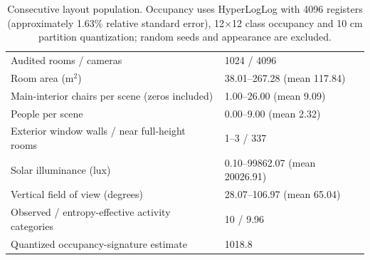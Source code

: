 \begin{table}[ht]
\centering\small
\begin{tabular}{p{.53\linewidth}p{.36\linewidth}}
\toprule
Audited rooms / cameras & 1024 / 4096 \\
Room area (m$^2$) & 38.01--267.28 (mean 117.84) \\
Main-interior chairs per scene (zeros included) & 1.00--26.00 (mean 9.09) \\
People per scene & 0.00--9.00 (mean 2.32) \\
Exterior window walls / near full-height rooms & 1--3 / 337 \\
Solar illuminance (lux) & 0.10--99862.07 (mean 20026.91) \\
Vertical field of view (degrees) & 28.07--106.97 (mean 65.04) \\
Observed / entropy-effective activity categories & 10 / 9.96 \\
Quantized occupancy-signature estimate & 1018.8 \\
\bottomrule
\end{tabular}
\caption{Consecutive layout population. Occupancy uses HyperLogLog with 4096 registers (approximately 1.63\% relative standard error), 12$\times$12 class occupancy and 10 cm partition quantization; random seeds and appearance are excluded.}\label{tab:diversity}
\end{table}
